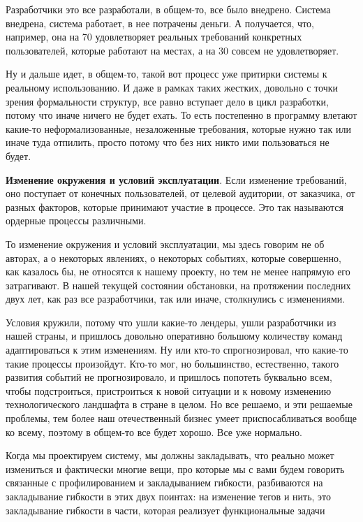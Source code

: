 Разработчики это все разработали, в общем-то, все было внедрено. Система внедрена, система работает, в нее потрачены деньги. А получается, что, например, она на 70 удовлетворяет реальных требований конкретных пользователей, которые работают на местах, а на 30 совсем не удовлетворяет.

Ну и дальше идет, в общем-то, такой вот процесс уже притирки системы к реальному использованию. И даже в рамках таких жестких, довольно с точки зрения формальности структур, все равно вступает дело в цикл разработки, потому что иначе ничего не будет ехать. То есть постепенно в программу влетают какие-то неформализованные, незаложенные требования, которые нужно так или иначе туда отпилить, просто потому что без них никто ими пользоваться не будет.

\textbf{Изменение окружения и условий эксплуатации}. Если изменение требований, оно поступает от конечных пользователей, от целевой аудитории, от заказчика, от разных факторов, которые принимают участие в процессе. Это так называются ордерные процессы различными.

То изменение окружения и условий эксплуатации, мы здесь говорим не об авторах, а о некоторых явлениях, о некоторых событиях, которые совершенно, как казалось бы, не относятся к нашему проекту, но тем не менее напрямую его затрагивают. В нашей текущей состоянии обстановки, на протяжении последних двух лет, как раз все разработчики, так или иначе, столкнулись с изменениями.

Условия кружили, потому что ушли какие-то лендеры, ушли разработчики из нашей страны, и пришлось довольно оперативно большому количеству команд адаптироваться к этим изменениям. Ну или кто-то спрогнозировал, что какие-то такие процессы произойдут. Кто-то мог, но большинство, естественно, такого развития событий не прогнозировало, и пришлось попотеть буквально всем, чтобы подстроиться, пристроиться к новой ситуации и к новому изменению технологического ландшафта в стране в целом. Но все решаемо, и эти решаемые проблемы, тем более наш отечественный бизнес умеет приспосабливаться вообще ко всему, поэтому в общем-то все будет хорошо. Все уже нормально.

Когда мы проектируем систему, мы должны закладывать, что реально может измениться и фактически многие вещи, про которые мы с вами будем говорить связанные с профилированием и закладыванием гибкости, разбиваются на закладывание гибкости в этих двух поинтах: на изменение тегов и нить, это закладывание гибкости в части, которая реализует функциональные задачи

